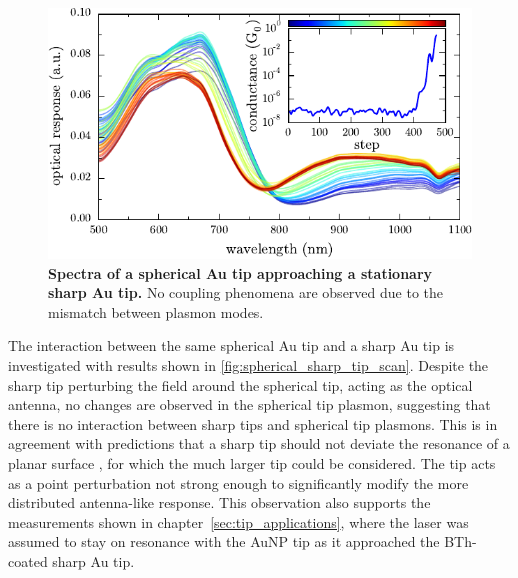 \documentclass[a4paper]{article}
\begin{document}
\begin{figure}[b]
\centering
\includegraphics{figures/sharp-AuNP_tip_dimer}
\caption[Spectra of a spherical Au tip approaching a stationary sharp Au tip]{\textbf{Spectra of a spherical Au tip approaching a stationary sharp Au tip.} No coupling phenomena are observed due to the mismatch between plasmon modes.}
\label{fig:spherical_sharp_tip_scan}
\end{figure}

The interaction between the same spherical Au tip and a sharp Au tip is investigated with results shown in \autoref{fig:spherical_sharp_tip_scan}. Despite the sharp tip perturbing the field around the spherical tip, acting as the optical antenna, no changes are observed in the spherical tip plasmon, suggesting that there is no interaction between sharp tips and spherical tip plasmons. This is in agreement with predictions that a sharp tip should not deviate the resonance of a planar surface \cite{downes2006, hugall2012}, for which the much larger tip could be considered. The tip acts as a point perturbation not strong enough to significantly modify the more distributed antenna-like response. This observation also supports the measurements shown in chapter~\ref{sec:tip_applications}, where the laser was assumed to stay on resonance with the AuNP tip as it approached the BTh-coated sharp Au tip.
\end{document}
